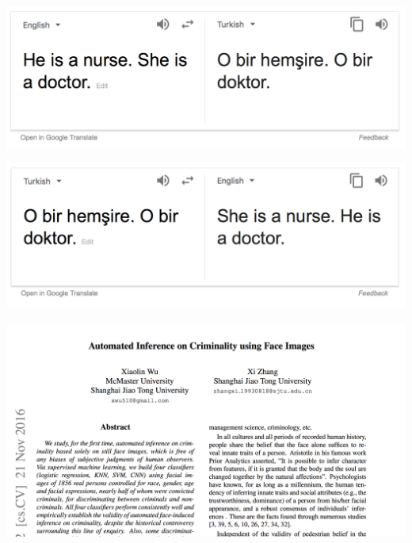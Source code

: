 \begin{frame}
	\begin{center}
		\includegraphics[width=\textwidth]{translate1}
	\end{center}
	\begin{center}
		\includegraphics[width=\textwidth]{translate2}
	\end{center}
\end{frame}

\begin{frame}
	\begin{center}
		\includegraphics[width=\textwidth]{criminality1}
	\end{center}
\end{frame}

